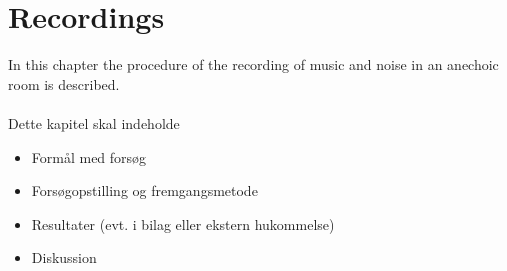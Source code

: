 \chapter{Recordings}
In this chapter the procedure of the recording of music and noise in an anechoic room is described.\\\\
Dette kapitel skal indeholde
\begin{itemize}
\item Formål med forsøg
\item Forsøgopstilling og fremgangsmetode
\item Resultater (evt. i bilag eller ekstern hukommelse)
\item Diskussion
\end{itemize}

